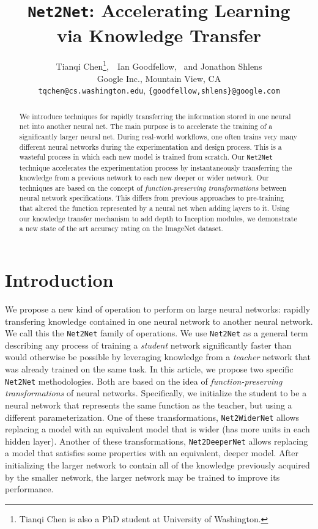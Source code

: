 \documentclass{article} %
\title{ {\tt Net2Net}: Accelerating Learning \\via Knowledge Transfer}
\author{Tianqi Chen\thanks{
Tianqi Chen is also a PhD student at University of Washington.
},\ \ Ian Goodfellow, \ and Jonathon Shlens
\\
Google Inc., Mountain View, CA\\
\texttt{tqchen@cs.washington.edu}, \texttt{\{goodfellow,shlens\}@google.com} \\
}
\begin{document}
\maketitle

\begin{abstract}
We introduce techniques for rapidly transferring the information stored in
one neural net into another neural net. The main purpose is to accelerate
the training of a significantly larger neural net.
During real-world workflows, one often trains very many different neural
networks during the experimentation and design process.
This is a wasteful process in which each new model is trained from scratch.
Our {\tt Net2Net} technique accelerates the experimentation process by
instantaneously transferring the knowledge from a previous network to each
new deeper or wider network.
Our techniques are based
on the concept of {\em function-preserving transformations} between neural
network specifications. This differs from previous approaches to
pre-training that altered the function represented by a neural net when
adding layers to it. Using our knowledge transfer mechanism to add depth to
Inception modules, we demonstrate a new state of the art accuracy rating on
the ImageNet dataset.
\end{abstract}

\section{Introduction}

We propose a new kind of operation to perform on large neural networks:
rapidly transfering knowledge contained in one neural network to another
neural network. We call this the {\tt Net2Net} family of operations.
We use {\tt Net2Net} as a general term describing any process
of training a {\em student} network significantly faster than would
otherwise be possible by leveraging knowledge from a {\em teacher} network
that was already trained on the same task.
In this article, we propose two specific {\tt Net2Net} methodologies. Both are
based on the idea of {\em function-preserving transformations} of neural networks.
Specifically, we initialize the student to be a neural network that
represents the same function as the teacher, but using a different
parameterization.
One of these transformations, {\tt Net2WiderNet} allows replacing a model with
an equivalent model that is wider (has more units in each hidden layer).
Another of these transformations, {\tt Net2DeeperNet} allows replacing a model
that satisfies some properties with an equivalent, deeper model.
After initializing the larger network to contain all of the knowledge
previously acquired by the smaller network, the larger network may be
trained to improve its performance.
\end{document}
